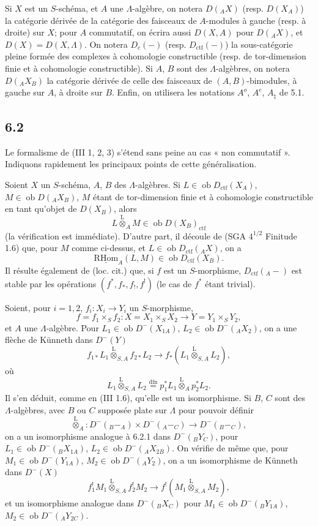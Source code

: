 \documentclass[11pt]{article}
\newcommand{\R}{\mathrm{R}}\newcommand{\RHomCore}{\mathrm{RHom}}
\providecommand{\RHom}{\RHomCore}
\providecommand{\uRHom}{\underline{\RHom}}
\providecommand{\lten}{\overset{\mathrm L}{\otimes}}
\providecommand{\Ob}{\operatorname{ob}}
\providecommand{\RHom}{\RHomCore}
\providecommand{\lten}{\overset{\mathrm L}{\otimes}}
\providecommand{\RHom}{\R\mathcal{H}om}
\providecommand{\lten}{\overset{\mathrm L}{\otimes}}
\providecommand{\Ob}{\operatorname{ob}}
\providecommand{\R}{\mathrm R}
\providecommand{\lten}{\overset{\mathrm L}{\otimes}}
\providecommand{\lten}{\overset{\mathrm L}{\otimes}}
\providecommand{\Ob}{\operatorname{Ob}}
\providecommand{\lten}{\overset{\mathrm L}{\otimes}}
\providecommand{\RHom}{\RHomCore}
\providecommand{\Ob}{\operatorname{ob}}
\providecommand{\Ob}{\operatorname{Ob}}
\providecommand{\lten}{\overset{\mathrm L}{\otimes}}
\begin{document}
Si $X$ est un $S$-schéma, et $A$ une $\Lambda$-algèbre, on notera $D({}_AX)$ (resp. $D(X_A)$) la catégorie dérivée de la catégorie des faisceaux de $A$-modules à gauche (resp. à droite) sur $X$; pour $A$ commutatif, on écrira aussi $D(X,A)$ pour $D({}_AX)$, et $D(X)=D(X,\Lambda)$. On notera $D_c(-)$ (resp. $D_{\mathrm{ctf}}(-)$) la sous-catégorie pleine formée des complexes à cohomologie constructible (resp. de tor-dimension finie et à cohomologie constructible). Si $A$, $B$ sont des $\Lambda$-algèbres, on notera $D({}_AX_B)$ la catégorie dérivée de celle des faisceaux de $(A,B)$-bimodules, à gauche sur $A$, à droite sur $B$. Enfin, on utilisera les notations $A^o$, $A^e$, $A_{\natural}$ de 5.1.

\subsection*{6.2}
Le formalisme de (III 1, 2, 3) s'étend sans peine au cas « non commutatif ». Indiquons rapidement les principaux points de cette généralisation.

Soient $X$ un $S$-schéma, $A$, $B$ des $\Lambda$-algèbres. Si $L\in\Ob D_{\mathrm{ctf}}(X_A)$, $M\in\Ob D({}_AX_B)$, $M$ étant de tor-dimension finie et à cohomologie constructible en tant qu'objet de $D(X_B)$, alors
\[
L\lten_A M\in\Ob D(X_B)_{\mathrm{ctf}}
\]
(la vérification est immédiate). D'autre part, il découle de (SGA $4^{1/2}$ Finitude 1.6) que, pour $M$ comme ci-dessus, et $L\in\Ob D_{\mathrm{ctf}}({}_AX)$, on a
\[
\uRHom_A(L,M)\in\Ob D_{\mathrm{ctf}}(X_B).
\]
Il résulte également de (loc. cit.) que, si $f$ est un $S$-morphisme, $D_{\mathrm{ctf}}({}_A-)$ est stable par les opérations $(f^*,f_*,f_!,f^!)$ (le cas de $f^*$ étant trivial).

Soient, pour $i=1,2$, $f_i:X_i\to Y_i$ un $S$-morphisme,
\[
f=f_1\times_S f_2:X=X_1\times_SX_2\longrightarrow Y=Y_1\times_SY_2,
\]
et $A$ une $\Lambda$-algèbre. Pour $L_1\in\Ob D^-(X_{1A})$, $L_2\in\Ob D^-({}_AX_2)$, on a une flèche de Künneth dans $D^-(Y)$
\begin{equation}
f_{1*}L_1\lten_{S,A}f_{2*}L_2
\longrightarrow
f_*(L_1\lten_{S,A}L_2),
\tag{6.2.1}
\end{equation}
où
\[
L_1\lten_{S,A}L_2
\stackrel{\mathrm{dfn}}{=}p_1^*L_1\lten_Ap_2^*L_2.
\]
Il s'en déduit, comme en (III 1.6), qu'elle est un isomorphisme. Si $B$, $C$ sont des $\Lambda$-algèbres, avec $B$ ou $C$ supposée plate sur $\Lambda$ pour pouvoir définir
\[
\lten_A:D^-({}_B{-}_A)\times D^-({}_A{-}_C)\longrightarrow D^-({}_B{-}_C),
\]
on a un isomorphisme analogue à 6.2.1 dans $D^-({}_BY_C)$, pour $L_1\in\Ob D^-({}_BX_{1A})$, $L_2\in\Ob D^-({}_AX_{2B})$. On vérifie de même que, pour $M_1\in\Ob D^-(Y_{1A})$, $M_2\in\Ob D^-({}_AY_2)$, on a un isomorphisme de Künneth dans $D^-(X)$
\begin{equation}
f_1^!M_1\lten_{S,A}f_2^!M_2
\longrightarrow
f^!(M_1\lten_{S,A}M_2),
\tag{6.2.2}
\end{equation}
et un isomorphisme analogue dans $D^-({}_B X_C)$ pour $M_1\in\Ob D^-({}_BY_{1A})$, $M_2\in\Ob D^-({}_AY_{2C})$.
\end{document}
